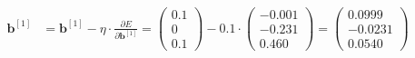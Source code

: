 \documentclass[12pt]{article}
\begin{document}
\begin{enumerate}
\begin{equation*}
\begin{aligned}
        \mathbf{b}^{[1]} &= \mathbf{b}^{[1]} - \eta \cdot \frac{\partial E}{\partial \mathbf{b}^{[1]}} = \begin{pmatrix}
            0.1\\
            0\\
            0.1
        \end{pmatrix} - 0.1 \cdot \begin{pmatrix}
            -0.001\\
            -0.231\\
            0.460
        \end{pmatrix} = \begin{pmatrix}
            0.0999\\
            -0.0231\\
            0.0540
        \end{pmatrix}
    \end{aligned}
\end{equation*}


\end{enumerate}
\end{document}
